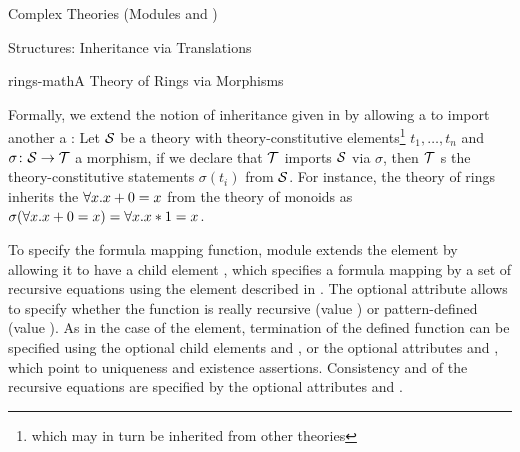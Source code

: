 \begin{tchapter}[id=complex-theories,short=Complex Theories]{Complex Theories (Modules
     and )}
\begin{tsection}[id=morphisms]{Structures: Inheritance via Translations}
\begin{myfig}{rings-math}{A Theory of Rings via Morphisms}
{}
\end{myfig}

Formally, we extend the notion of inheritance given in  by
allowing a  to import another a 
: Let ${\cal S}$ be a theory with theory-constitutive
elements\footnote{which may in turn be inherited from other theories} $t_1,\ldots,t_n$ and
$\sigma\colon{\cal S}\to{\cal T}$ a morphism, if we declare that ${\cal T}$ imports ${\cal S}$ via $\sigma$,
then ${\cal T}$ {s} the theory-constitutive statements $\sigma(t_i)$ from
${\cal S}$. For instance, the theory of rings inherits the 
${\forall{x}.{x+0=x}}$ from the theory of monoids as
$\sigma({\forall{x}.{x+0=x}})={\forall{x}.{x*1=x}}$.

To specify the formula mapping function, module  extends the
 element by allowing it to have a child element ,
which specifies a formula mapping by a set of recursive equations using the
 element described in . The optional
attribute  allows to specify whether the function is really
recursive (value ) or pattern-defined (value
). As in the case of the  element,
termination of the defined function can be specified using the optional child elements
 and , or the optional attributes
 and , which point to
uniqueness and existence assertions. Consistency and
 of the recursive equations are specified by the optional
attributes  and .


\end{tsection}
\end{tchapter}
